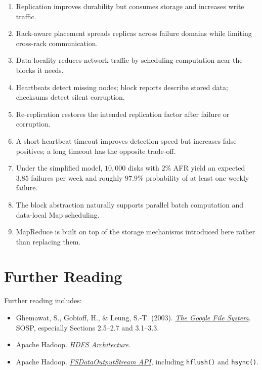 \documentclass[11pt,a4paper,oneside]{book}
\begin{document}
\begin{enumerate}
    \item Replication improves durability but consumes storage and increases write traffic.
    \item Rack-aware placement spreads replicas across failure domains while limiting cross-rack communication.
    \item Data locality reduces network traffic by scheduling computation near the blocks it needs.
    \item Heartbeats detect missing nodes; block reports describe stored data; checksums detect silent corruption.
    \item Re-replication restores the intended replication factor after failure or corruption.
    \item A short heartbeat timeout improves detection speed but increases false positives; a long timeout has the opposite trade-off.
    \item Under the simplified model, \(10{,}000\) disks with \(2\%\) AFR yield an expected \(3.85\) failures per week and roughly \(97.9\%\) probability of at least one weekly failure.
    \item The block abstraction naturally supports parallel batch computation and data-local Map scheduling.
    \item MapReduce is built on top of the storage mechanisms introduced here rather than replacing them.
\end{enumerate}

\section{Further Reading}

Further reading includes:

\begin{itemize}
    \item Ghemawat, S., Gobioff, H., \& Leung, S.-T. (2003). \href{https://research.google/pubs/the-google-file-system/}{\emph{The Google File System}}. SOSP, especially Sections 2.5--2.7 and 3.1--3.3.
    \item Apache Hadoop. \href{https://hadoop.apache.org/docs/stable/hadoop-project-dist/hadoop-hdfs/HdfsDesign.html}{\emph{HDFS Architecture}}.
    \item Apache Hadoop. \href{https://hadoop.apache.org/docs/stable/api/org/apache/hadoop/fs/FSDataOutputStream.html}{\emph{FSDataOutputStream API}}, including \texttt{hflush()} and \texttt{hsync()}.
\end{itemize}
\end{document}
